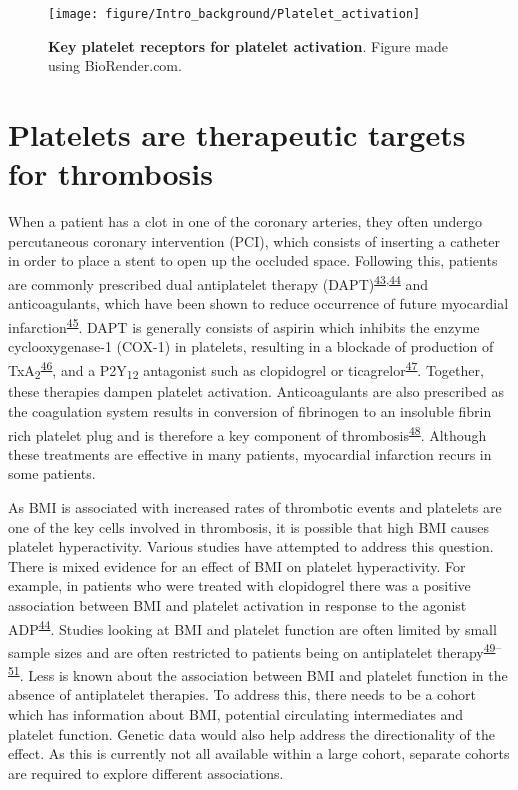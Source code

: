\documentclass[11pt,twoside]{bristolthesis}
\begin{document}
\begin{figure}
\texttt{[image: figure/Intro\_background/Platelet\_activation]} \caption[Key platelet receptors for platelet activation]{\textbf{Key platelet receptors for platelet activation}. Figure made using BioRender.com.}\label{fig:platelet-activation-receptors}
\end{figure}
\hypertarget{platelets-are-therapeutic-targets-for-thrombosis}{%
\section{Platelets are therapeutic targets for thrombosis}\label{platelets-are-therapeutic-targets-for-thrombosis}}

When a patient has a clot in one of the coronary arteries, they often undergo percutaneous coronary intervention (PCI), which consists of inserting a catheter in order to place a stent to open up the occluded space. Following this, patients are commonly prescribed dual antiplatelet therapy (DAPT)\textsuperscript{\protect\hyperlink{ref-Freynhofer2017a}{43},\protect\hyperlink{ref-Nardin2015}{44}} and anticoagulants, which have been shown to reduce occurrence of future myocardial infarction\textsuperscript{\protect\hyperlink{ref-Khan2020}{45}}. DAPT is generally consists of aspirin which inhibits the enzyme cyclooxygenase-1 (COX-1) in platelets, resulting in a blockade of production of TxA\textsubscript{2}\textsuperscript{\protect\hyperlink{ref-Warner2011}{46}}, and a P2Y\textsubscript{12} antagonist such as clopidogrel or ticagrelor\textsuperscript{\protect\hyperlink{ref-Degrauwe2017}{47}}. Together, these therapies dampen platelet activation. Anticoagulants are also prescribed as the coagulation system results in conversion of fibrinogen to an insoluble fibrin rich platelet plug and is therefore a key component of thrombosis\textsuperscript{\protect\hyperlink{ref-Grover2019}{48}}. Although these treatments are effective in many patients, myocardial infarction recurs in some patients.

As BMI is associated with increased rates of thrombotic events and platelets are one of the key cells involved in thrombosis, it is possible that high BMI causes platelet hyperactivity. Various studies have attempted to address this question. There is mixed evidence for an effect of BMI on platelet hyperactivity. For example, in patients who were treated with clopidogrel there was a positive association between BMI and platelet activation in response to the agonist ADP\textsuperscript{\protect\hyperlink{ref-Nardin2015}{44}}. Studies looking at BMI and platelet function are often limited by small sample sizes and are often restricted to patients being on antiplatelet therapy\textsuperscript{\protect\hyperlink{ref-Deharo2014}{49}--\protect\hyperlink{ref-Pankert2014}{51}}. Less is known about the association between BMI and platelet function in the absence of antiplatelet therapies. To address this, there needs to be a cohort which has information about BMI, potential circulating intermediates and platelet function. Genetic data would also help address the directionality of the effect. As this is currently not all available within a large cohort, separate cohorts are required to explore different associations.
\end{document}
